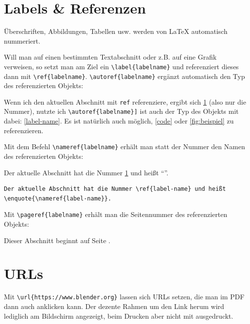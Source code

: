 	\section{Labels \& Referenzen}\label{label-name}
		Überschriften, Abbildungen, Tabellen usw. werden von \LaTeX{} automatisch nummeriert.
		
		Will man auf einen bestimmten Textabschnitt oder z.B. auf eine Grafik verweisen, so setzt man am Ziel ein \lstinline|\label{labelname}| und referenziert dieses dann mit \lstinline|\ref{labelname}|.
		\lstinline|\autoref{labelname}| ergänzt automatisch den Typ des referenzierten Objekts:
		
		\begin{vorlagenbeispiel}
		Wenn ich den aktuellen Abschnitt mit \lstinline|ref| referenziere, ergibt sich \ref{label-name} (also nur die Nummer), nutzte ich \lstinline|\autoref{labelname}]| ist auch der Typ des Objekts mit dabei: \autoref{label-name}.
%		
		Es ist natürlich auch möglich, \autoref{code} oder \autoref{fig:beispiel} zu referenzieren.
		\end{vorlagenbeispiel}
		
		Mit dem Befehl \lstinline|\nameref{labelname}| erhält man statt der Nummer den Namen des referenzierten Objekts:
		
		\begin{vorlagenbeispiel}
			Der aktuelle Abschnitt hat die Nummer \ref{label-name} und heißt \enquote{}.
		\end{vorlagenbeispiel}
		
		\begin{lstlisting}[language=thesis-latexbeispiel]
Der aktuelle Abschnitt hat die Nummer \ref{label-name} und heißt \enquote{\nameref{label-name}}.
		\end{lstlisting}
		
		Mit \lstinline|\pageref{labelname}| erhält man die Seitennummer des referenzierten Objekts:
		
		\begin{vorlagenbeispiel}
			Dieser Abschnitt beginnt auf Seite \pageref{label-name}.
		\end{vorlagenbeispiel}
			
	\section{URLs}
		Mit \lstinline[language=thesis-latexbeispiel]|\url{https://www.blender.org}| lassen sich URLs setzen, die man im PDF dann auch anklicken kann. Der dezente Rahmen um den Link herum wird lediglich am Bildschirm angezeigt, beim Drucken aber nicht mit ausgedruckt.
		
